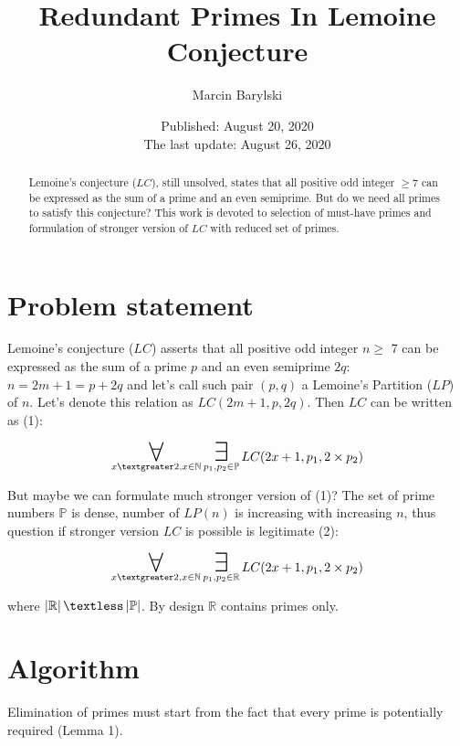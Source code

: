 \documentclass[10pt,twocolumn]{article}
\title{Redundant Primes In Lemoine Conjecture}
\author{Marcin Barylski}
\date{\small{Published: August 20, 2020 \\ The last update: August 26, 2020}}
\newcommand\bigforall{\mbox{\huge $\mathsurround0pt\forall$}}
\newcommand\bigexists{\mbox{\huge $\mathsurround0pt\exists$}}
\begin{document}
\maketitle

\begin{abstract}
Lemoine's conjecture ($LC$), still unsolved, states that all positive odd integer $\geq 7$ can be expressed as the sum of a prime and an even semiprime. But do we need all primes to satisfy this conjecture? This work is devoted to selection of must-have primes and formulation of stronger version of $LC$ with reduced set of primes.
\end{abstract}

\section{Problem statement}

Lemoine's conjecture ($LC$) \cite{Lemoine1896} asserts that all positive odd integer $n \geq$ 7 can be expressed as the sum of a prime $p$ and an even semiprime $2q$: $n = 2m + 1 = p + 2q$ and let's call such pair $(p, q)$ a Lemoine's Partition ($LP$) of $n$. Let's denote this relation as $LC (2m+1, p, 2q)$. Then $LC$ can be written as (1):

\begin{equation}
\displaystyle\mathop{\bigforall}_{x \textgreater 2, x \in \mathbb{N}} \displaystyle\mathop{\bigexists}_{p_1, p_2 \in \mathbb{P}} LC (2x+1, p_1, 2 \times p_2)
\end{equation}

But maybe we can formulate much stronger version of (1)? The set of prime numbers $\mathbb{P}$ is dense, number of $LP(n)$ is increasing with increasing $n$, thus question if stronger version $LC$ is possible is legitimate (2):

\begin{equation}
\displaystyle\mathop{\bigforall}_{x \textgreater 2, x \in \mathbb{N}} \displaystyle\mathop{\bigexists}_{p_1, p_2 \in \mathbb{R}} LC (2x+1, p_1, 2 \times p_2)
\end{equation}

where $\left\vert \mathbb{R} \right\vert \textless \left\vert \mathbb{P} \right\vert$. By design $\mathbb{R}$ contains primes only.

\section{Algorithm}

Elimination of primes must start from the fact that every prime is potentially required (Lemma 1).
\end{document}
